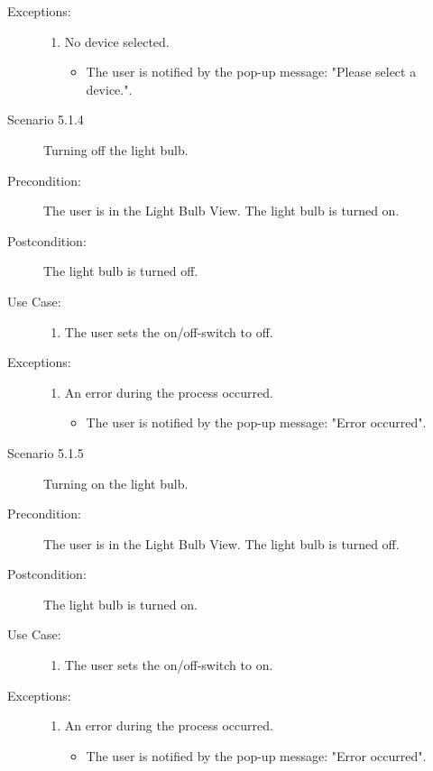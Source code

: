 \documentclass[a4paper]{article}
\begin{document}
\begin{description}
\item[Exceptions:]
\item[]
\begin{enumerate}
\item No device selected.
\begin{itemize}
\item The user is notified by the pop-up message: "Please select a device.".
\end{itemize}
\end{enumerate}

\item[]

\item[Scenario 5.1.4] Turning off the light bulb.
\item[Precondition:] The user is in the Light Bulb View. The light bulb is turned on.
\item[Postcondition:] The light bulb is turned off.
\item[Use Case:]\mbox{}
\begin{enumerate}
\item  The user sets the on/off-switch to off.
\end{enumerate}

\item[Exceptions:]
\item[]
\begin{enumerate}
\item An error during the process occurred.
\begin{itemize}
\item The user is notified by the pop-up message: "Error occurred".
\end{itemize}
\end{enumerate}

\item[]
\item[Scenario 5.1.5] Turning on the light bulb.
\item[Precondition:] The user is in the Light Bulb View. The light bulb is turned off.
\item[Postcondition:] The light bulb is turned on.
\item[Use Case:]\mbox{}
\begin{enumerate}
\item  The user sets the on/off-switch to on.
\end{enumerate}

\item[Exceptions:]
\item[]
\begin{enumerate}
\item An error during the process occurred.
\begin{itemize}
\item The user is notified by the pop-up message: "Error occurred".
\end{itemize}
\end{enumerate}


\end{description}
\end{document}

